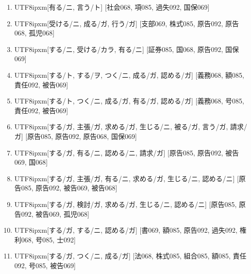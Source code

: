 \begin{enumerate}
\item \begin{CJK}{UTF8}{ipxm}[有る/ニ, 言う/ト] [社会068, 項085, 過失092, 国保069]\end{CJK}
\item \begin{CJK}{UTF8}{ipxm}[受ける/ニ, 成る/ガ, 行う/ガ] [支部069, 株式085, 原告092, 原告068, 孤児068]\end{CJK}
\item \begin{CJK}{UTF8}{ipxm}[する/ニ, 受ける/カラ, 有る/ニ] [証券085, 国068, 原告092, 国保069]\end{CJK}
\item \begin{CJK}{UTF8}{ipxm}[する/ト, する/ヲ, つく/ニ, 成る/ガ, 認める/ガ] [義務068, 額085, 責任092, 被告069]\end{CJK}
\item \begin{CJK}{UTF8}{ipxm}[する/ト, つく/ニ, 成る/ガ, 有る/ガ, 認める/ガ] [義務068, 号085, 責任092, 被告069]\end{CJK}
\item \begin{CJK}{UTF8}{ipxm}[する/ガ, 主張/ガ, 求める/ガ, 生じる/ニ, 被る/ガ, 言う/ガ, 請求/ガ] [原告085, 原告092, 原告068, 国保069]\end{CJK}
\item \begin{CJK}{UTF8}{ipxm}[する/ガ, 有る/ニ, 認める/ニ, 請求/ガ] [原告085, 原告092, 被告069, 国068]\end{CJK}
\item \begin{CJK}{UTF8}{ipxm}[する/ガ, 主張/ガ, 有る/ニ, 求める/ガ, 生じる/ニ, 認める/ニ] [原告085, 原告092, 被告069, 被告068]\end{CJK}
\item \begin{CJK}{UTF8}{ipxm}[する/ガ, 検討/ガ, 求める/ガ, 生じる/ニ, 認める/ニ] [原告085, 原告092, 被告069, 孤児068]\end{CJK}
\item \begin{CJK}{UTF8}{ipxm}[する/ガ, する/ニ, 認める/ガ] [書069, 額085, 原告092, 過失092, 権利068, 号085, 士092]\end{CJK}
\item \begin{CJK}{UTF8}{ipxm}[する/ガ, つく/ニ, 成る/ガ] [法068, 株式085, 組合085, 額085, 責任092, 号085, 被告069]\end{CJK}

\end{enumerate}
